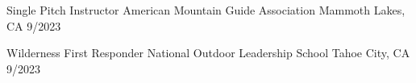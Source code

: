 



\begin{cvhonors}

  \cvhonor
    {Single Pitch Instructor} %
    {American Mountain Guide Association} %
    {Mammoth Lakes, CA} %
    {9/2023} %






  \cvhonor
    {Wilderness First Responder} %
    {National Outdoor Leadership School} %
    {Tahoe City, CA} %
    {9/2023} %

\end{cvhonors}
